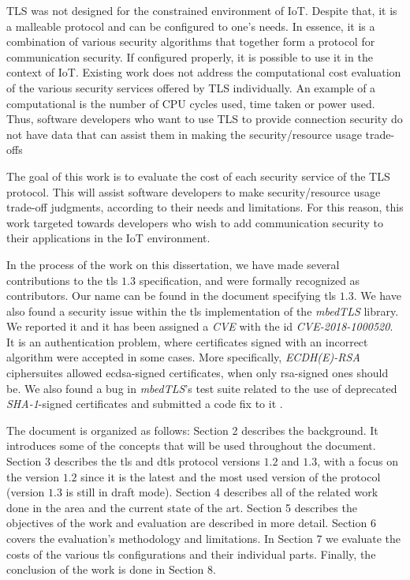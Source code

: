 \documentclass{llncs}
\begin{document}
TLS was not designed for the constrained environment of IoT. Despite that,
it is a malleable protocol and can be configured to one's needs. In essence,
it is a combination of various security algorithms that together form
a protocol for communication security. If configured
properly, it is possible to use it in the context of IoT. Existing work
does not address the computational cost evaluation of the various security services
offered by TLS individually. An example of a computational is the number of CPU
cycles used, time taken or power used. Thus, software developers
who want to use TLS to provide connection security do not have data that can
assist them in making the security/resource usage trade-offs

The goal of this work is to evaluate the cost of each security service of the
TLS protocol. This will assist software developers to make security/resource usage
trade-off judgments, according to their needs and limitations. For this reason,
this work targeted towards developers who wish to add communication security
to their applications in the IoT environment.

In the process of the work on this dissertation, we have made several
contributions to the \gls{tls} $1.3$ specification, and were formally recognized as 
contributors\cite{Mergepul65:online}. Our name can be found in the document specifying \gls{tls} $1.3$\cite{RFC8446}.
We have also found a security issue within the
\gls{tls} implementation of the \textit{mbedTLS} library. We reported it and it
has been assigned a \textit{CVE} with the id \textit{CVE-2018-1000520}\cite{NVDCVE2094:online}.
It is an authentication problem, where certificates signed with an incorrect algorithm
were accepted in some cases. More specifically, \textit{ECDH(E)-RSA} ciphersuites allowed \gls{ecdsa}-signed
certificates, when only \gls{rsa}-signed ones should be. We also found a bug in \textit{mbedTLS}'s test suite
related to the use of deprecated \textit{SHA-1}-signed certificates and submitted a code fix to 
it \cite{sslserve89:onelin}\cite{updatete23:online}.

The document is organized as follows: Section 2 describes the background. It
introduces some of the concepts that will be used throughout
the document. Section 3 describes the \gls{tls} and \gls{dtls} protocol
versions $1.2$ and $1.3$, with a focus on the version $1.2$ since
it is the latest and the most used version of the protocol (version $1.3$ is still in
draft mode). Section 4 describes all of the related work done in the area and
the current state of the art. Section 5 describes the objectives of the work and evaluation 
are described in more detail. 
Section 6
covers the evaluation's methodology and limitations. In Section 7 we evaluate the costs of the various \gls{tls}
configurations and their individual parts. Finally, the conclusion of the work is done in Section 8.
\end{document}
